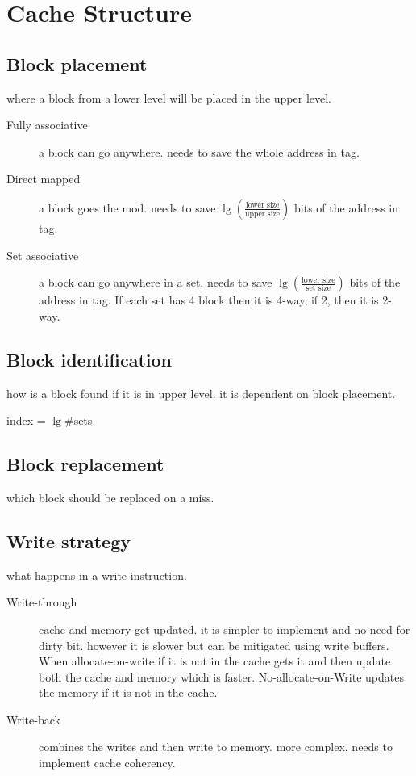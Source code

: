\section{Cache Structure}
\subsection{Block placement}
where a block from a lower level will be placed in the upper level.
\begin{description}
    \item[Fully associative] a block can go anywhere. needs to save the whole address in tag.
    \item[Direct mapped]  a block goes the mod. needs to save \( \lg \!\left(\frac{\text{lower size}}{\text{upper size}}\right)\) bits of the address in tag.
    \item[Set associative] a block can go anywhere in a set.  needs to save \( \lg \!\left(\frac{\text{lower size}}{\text{set size}}\right)\) bits of the address in tag. If each set has 4 block then it is 4-way, if 2, then it is 2-way.
\end{description}
\subsection{Block identification}
how is a block found if it is in upper level. it is dependent on block placement.
\begin{center}
    index = \(\lg \#\)sets
\end{center}
\subsection{Block replacement}
which block should be replaced on a miss.
\subsection{Write strategy}
what happens in a write instruction.
\begin{description}
    \item[Write-through] cache and memory get updated. it is simpler to implement and no need for dirty bit. however it is slower but can be mitigated using write buffers. When allocate-on-write if it is not in the cache gets it and then update both the cache and memory which is faster. No-allocate-on-Write updates the memory if it is not in the cache.
    \item  [Write-back] combines the writes and then write to memory. more complex, needs to implement cache coherency.
\end{description}

